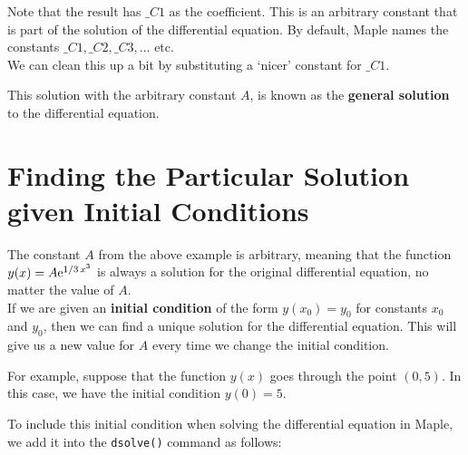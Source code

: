 \noindent
Note that the result has $\_C1$ as the coefficient. This is an arbitrary constant that is part of the solution of the differential equation. By default, Maple names the constants $\_C1, \_C2, \_C3, \ldots \text{ etc}$.\\

We can clean this up a bit by substituting a `nicer' constant for $\_C1$.


\begin{maplegroup}
	\begin{mapleinput}
	\end{mapleinput}
	\mapleresult
	\begin{maplelatex}
		\mapleinline{inert}{2d}{desoln := A*exp((1/3)*x^3)}{\[\displaystyle desoln :={\it A}\,{{\rm e}^{1/3\,{x}^{3}}}\]}
	\end{maplelatex}
\end{maplegroup}

\noindent
This solution with the arbitrary constant $A$, is known as the \textbf{general solution} to the differential equation.

\section{Finding the Particular Solution given Initial Conditions}


The constant $A$ from the above example is arbitrary, meaning that the function $y(x)=A{\rm e}^{1/3\,{x}^{3}}$ is always a solution for the original differential equation, no matter the value of $A$.\\

If we are given an \textbf{initial condition} of the form $y(x_0)=y_0$ for constants $x_0$ and $y_0$, then we can find a unique solution for the differential equation. This will give us a new value for $A$ every time we change the initial condition.

For example, suppose that the function $y(x)$ goes through the point $(0,5)$. In this case, we have the initial condition $y(0)=5$.

To include this initial condition when solving the differential equation in Maple, we add it into the \texttt{dsolve()} command as follows:
\begin{maplegroup}
\begin{mapleinput}
\end{mapleinput}

\mapleresult
\begin{maplelatex}
\end{maplelatex}
\end{maplegroup}

